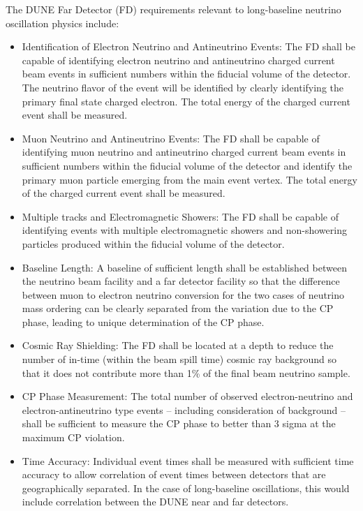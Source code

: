 The DUNE Far Detector (FD) requirements relevant to long-baseline neutrino oscillation physics include:
\begin{itemize}
 \item Identification of Electron Neutrino and Antineutrino Events: The FD shall be capable of identifying electron neutrino and antineutrino charged current beam events in sufficient numbers within the fiducial volume of the detector. The neutrino flavor of the event will be identified by clearly identifying the primary final state charged electron. The total energy of the charged current event shall be measured. 
 \item Muon Neutrino and Antineutrino Events: The FD shall be capable of identifying muon neutrino and antineutrino charged current beam events in sufficient numbers within the fiducial volume of the detector and identify the primary muon particle emerging from the main event vertex.  The total energy of the charged current event shall be measured. 
 \item Multiple tracks and Electromagnetic Showers: The FD shall be capable of identifying events with multiple electromagnetic showers and non-showering particles produced within the fiducial volume of the detector.
 \item Baseline Length: A baseline of sufficient length shall be established between the neutrino beam facility and a far detector facility so that the difference between muon to electron neutrino conversion for the two cases of neutrino mass ordering can be clearly separated from the variation due to the CP phase, leading to unique determination of the CP phase.
 \item  Cosmic Ray Shielding: The FD shall be located at a depth to reduce the number of in-time (within the beam spill time) cosmic ray background so that it does not contribute more than 1\% of the final beam neutrino sample. 
 \item CP Phase Measurement: The total number of observed electron-neutrino and electron-antineutrino type events -- including consideration of background -- shall be sufficient to measure the CP phase to better than 3 sigma at the maximum CP violation. 
 \item Time Accuracy: Individual event times shall be measured with sufficient time accuracy to allow correlation of event times between detectors that are geographically separated. In the case of long-baseline oscillations, this would include correlation between the DUNE near and far detectors.  
\end{itemize}


